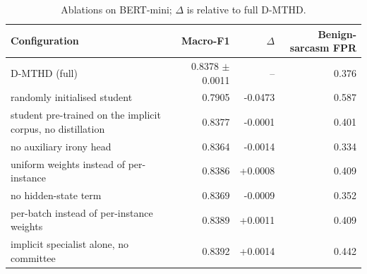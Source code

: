 \begin{table}[t]
\centering
\caption{Ablations on BERT-mini; $\Delta$ is relative to full D-MTHD.}
\label{tab:ablations}
\begin{tabular}{lrrr}
\toprule
Configuration & Macro-F1 & $\Delta$ & Benign-sarcasm FPR \\
\midrule
D-MTHD (full) & 0.8378 $\pm$ 0.0011 & -- & 0.376 \\
randomly initialised student & 0.7905 & -0.0473 & 0.587 \\
student pre-trained on the implicit corpus, no distillation & 0.8377 & -0.0001 & 0.401 \\
no auxiliary irony head & 0.8364 & -0.0014 & 0.334 \\
uniform weights instead of per-instance & 0.8386 & +0.0008 & 0.409 \\
no hidden-state term & 0.8369 & -0.0009 & 0.352 \\
per-batch instead of per-instance weights & 0.8389 & +0.0011 & 0.409 \\
implicit specialist alone, no committee & 0.8392 & +0.0014 & 0.442 \\
\bottomrule
\end{tabular}
\end{table}